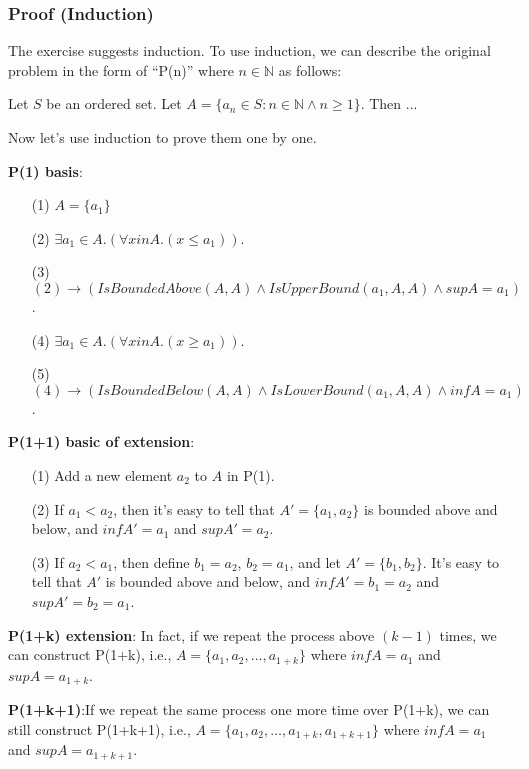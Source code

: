 \documentclass[12pt, letterpaper, oneside]{book}
\begin{document}
\subsubsection{Proof (Induction)}

The exercise suggests induction. To use induction, we can describe the original problem in the form of ``P(n)'' where
$n \in \mathbb{N}$ as follows:

\begin{displayquote}
  Let $S$ be an ordered set. Let $A = \{ a_n \in S: n \in \mathbb{N} \land n \ge 1 \}$. Then ...
\end{displayquote}

Now let's use induction to prove them one by one.

\textbf{P(1) basis}:
\begin{enumerate}
  \item[(1)] $A = \{a_1\}$
  \item[(2)] $\exists a_1 \in A. (\forall x in A. (x \leqslant a_1))$.
  \item[(3)] $(2) \rightarrow (IsBoundedAbove(A, A) \land IsUpperBound(a_1, A, A) \land sup A = a_1)$.
  \item[(4)] $\exists a_1 \in A. (\forall x in A. (x \geqslant a_1))$.
  \item[(5)] $(4) \rightarrow (IsBoundedBelow(A, A) \land IsLowerBound(a_1, A, A) \land inf A = a_1)$.
\end{enumerate}

\textbf{P(1+1) basic of extension}:
\begin{enumerate}
  \item[(1)] Add a new element $a_2$ to $A$ in P(1).
  \item[(2)] If $a_1 < a_2$, then it's easy to tell that $A'=\{a_1, a_2\}$ is bounded above and below, and $inf A' = a_1$
        and $sup A' = a_2$.
  \item[(3)] If $a_2 < a_1$, then define $b_1 = a_2$, $b_2 = a_1$, and let $A'=\{b_1, b_2\}$. It's easy to tell that $A'$
        is bounded above and below, and $inf A' = b_1 = a_2$ and $sup A' = b_2 = a_1$.
\end{enumerate}

\textbf{P(1+k) extension}: In fact, if we repeat the process above $(k-1)$ times, we can construct P(1+k), i.e.,
$A = \{a_1, a_2, \ldots, a_{1+k}\}$ where $inf A = a_1$ and $sup A = a_{1+k}$.

\textbf{P(1+k+1)}:If we repeat the same process one more time over P(1+k), we can still construct P(1+k+1), i.e.,
$A = \{a_1, a_2, \ldots, a_{1+k}, a_{1+k+1}\}$ where $inf A = a_1$ and $sup A = a_{1+k+1}$.
\end{document}
